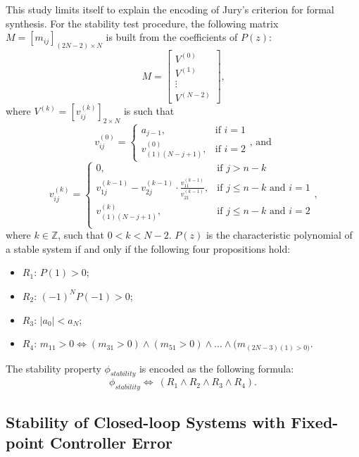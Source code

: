 \documentclass[runningheads,a4paper]{llncs}
\begin{document}
This study limits itself to explain the encoding of Jury's criterion for
formal synthesis.  For the stability test procedure, the following matrix
$M=[m_{ij}]_{(2N-2)\times N}$ is built from the coefficients of $P(z)$:
%
$$
M=\left[
\begin{matrix}
  V^{(0)} \\
  V^{(1)} \\
  \vdots \\
  V^{(N-2)}
 \end{matrix}
\right]\mbox{,}
$$
\noindent where $V^{(k)}=[v^{(k)}_{ij}]_{2\times N}$ is such that
$$
v^{(0)}_{ij}=\begin{cases} 
a_{j-1}, & \mbox{if } i=1 \\   v^{(0)}_{(1)(N-j+1)}, & \mbox{if } i=2 
\end{cases}\mbox{, and} 
$$
$$
v^{(k)}_{ij}=\begin{cases} 
0, & \mbox{if } j>n-k\\
v^{(k-1)}_{1j}-v^{(k-1)}_{2j}\cdot\frac{v^{(k-1)}_{11}}{v^{(k-1)}_{21}}, & \mbox{if } j\leq n-k  \mbox{ and } i=1 \\
v^{(k)}_{(1)(N-j+1)}, & \mbox{if } j\leq n-k \mbox{ and } i=2 \\
\end{cases} \mbox{,}
$$
\noindent where $k\in\mathbb{Z}$, such that $0<k<N-2$. $P(z)$ is the 
characteristic polynomial of a stable system if and only if the following 
four propositions hold:
\begin{itemize}
\item $R_{1}$: $P(1)>0$;
\item $R_{2}$: $(-1)^{N}P(-1)>0$;
\item $R_{3}$: $\vert{a_{0}}\vert <a_{N}$;
\item $R_{4}$: $m_{11}>0\iff (m_{31}>0)\wedge (m_{51}>0)\wedge \dots \wedge (m_{(2N-3)(1)>0)}$.
\end{itemize}
%
The stability property $\phi_\mathit{stability}$ is encoded as the following formula:
$$
\phi_\mathit{stability}\iff \ (R_{1} \wedge R_{2} \wedge R_{3} \wedge R_{4}).
$$

\subsection{Stability of Closed-loop Systems with Fixed-point Controller Error}
\end{document}
